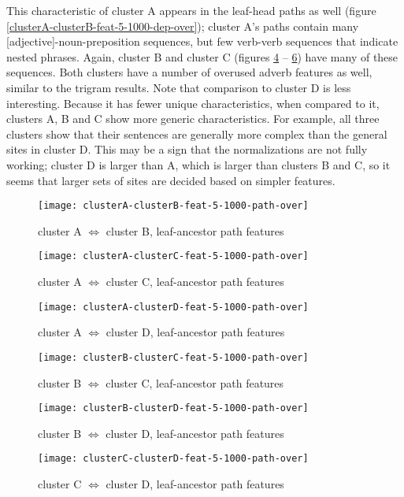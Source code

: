 This characteristic of cluster A appears in the leaf-head paths as
well (figure \ref{clusterA-clusterB-feat-5-1000-dep-over}); cluster
A's paths contain many [adjective]-noun-preposition sequences, but few
verb-verb sequences that indicate nested phrases. Again, cluster B and
cluster C (figures \ref{clusterB-clusterC-feat-5-1000-path-over} --
\ref{clusterC-clusterD-feat-5-1000-path-over}) have many of these
sequences. Both clusters have a number of overused adverb features as
well, similar to the trigram results. Note that comparison to cluster
D is less interesting. Because it has fewer unique characteristics,
when compared to it, clusters A, B and C show more generic
characteristics. For example, all three clusters show that their
sentences are generally more complex than the general sites in cluster
D. This may be a sign that the normalizations are not fully working;
cluster D is larger than A, which is larger than clusters B and C, so
it seems that larger sets of sites are decided based on simpler
features.

\begin{figure}
  \texttt{[image: clusterA-clusterB-feat-5-1000-path-over]}
  \caption{cluster A $\Leftrightarrow$ cluster B, leaf-ancestor path features}
  \label{clusterA-clusterB-feat-5-1000-path-over}
\end{figure}
\begin{figure}
  \texttt{[image: clusterA-clusterC-feat-5-1000-path-over]}
  \caption{cluster A $\Leftrightarrow$ cluster C, leaf-ancestor path features}
  \label{clusterA-clusterC-feat-5-1000-path-over}
\end{figure}
\begin{figure}
  \texttt{[image: clusterA-clusterD-feat-5-1000-path-over]}
  \caption{cluster A $\Leftrightarrow$ cluster D, leaf-ancestor path features}
  \label{clusterA-clusterD-feat-5-1000-path-over}
\end{figure}
\begin{figure}
  \texttt{[image: clusterB-clusterC-feat-5-1000-path-over]}
  \caption{cluster B $\Leftrightarrow$ cluster C, leaf-ancestor path features}
  \label{clusterB-clusterC-feat-5-1000-path-over}
\end{figure}
\begin{figure}
  \texttt{[image: clusterB-clusterD-feat-5-1000-path-over]}
  \caption{cluster B $\Leftrightarrow$ cluster D, leaf-ancestor path features}
  \label{clusterB-clusterD-feat-5-1000-path-over}
\end{figure}
\begin{figure}
  \texttt{[image: clusterC-clusterD-feat-5-1000-path-over]}
  \caption{cluster C $\Leftrightarrow$ cluster D, leaf-ancestor path features}
  \label{clusterC-clusterD-feat-5-1000-path-over}
\end{figure}


